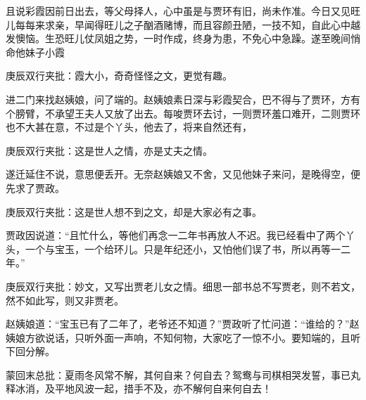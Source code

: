 \begin{parag}


    且说彩霞因前日出去，等父母择人，心中虽是与贾环有旧，尚未作准。今日又见旺儿每每来求亲，早闻得旺儿之子酗酒赌博，而且容颜丑陋，一技不知，自此心中越发懊恼。生恐旺儿仗凤姐之势，一时作成，终身为患，不免心中急躁。遂至晚间悄命他妹子小霞\begin{note}庚辰双行夹批：霞大小，奇奇怪怪之文，更觉有趣。\end{note}进二门来找赵姨娘，问了端的。赵姨娘素日深与彩霞契合，巴不得与了贾环，方有个膀臂，不承望王夫人又放了出去。每唆贾环去讨，一则贾环羞口难开，二则贾环也不大甚在意，不过是个丫头，他去了，将来自然还有，\begin{note}庚辰双行夹批：这是世人之情，亦是丈夫之情。\end{note}遂迁延住不说，意思便丢开。无奈赵姨娘又不舍，又见他妹子来问，是晚得空，便先求了贾政。\begin{note}庚辰双行夹批：这是世人想不到之文，却是大家必有之事。\end{note}贾政因说道：“且忙什么，等他们再念一二年书再放人不迟。我已经看中了两个丫头，一个与宝玉，一个给环儿。只是年纪还小，又怕他们误了书，所以再等一二年。”\begin{note}庚辰双行夹批：妙文，又写出贾老儿女之情。细思一部书总不写贾老，则不若文，然不如此写，则又非贾老。\end{note}赵姨娘道：“宝玉已有了二年了，老爷还不知道？”贾政听了忙问道：“谁给的？”赵姨娘方欲说话，只听外面一声响，不知何物，大家吃了一惊不小。要知端的，且听下回分解。
\end{parag}

\begin{parag}

    \begin{note}蒙回末总批：夏雨冬风常不解，其何自来？何自去？鸳鸯与司棋相哭发誓，事已丸释冰消，及平地风波一起，措手不及，亦不解何自来何自去！\end{note}
\end{parag}
